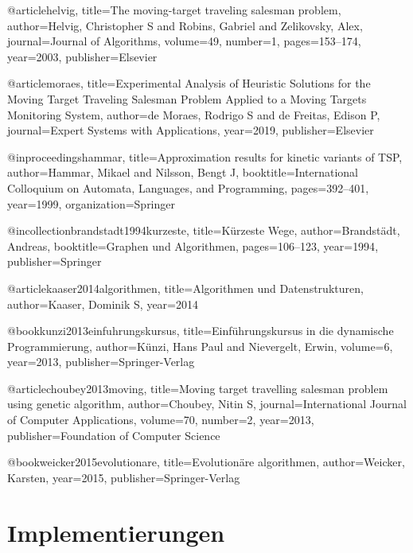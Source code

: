 \documentclass[german,version-2019-11]{uzl-thesis}
\begin{document}
\begin{bibtex-entries}
@article{helvig,
  title={The moving-target traveling salesman problem},
  author={Helvig, Christopher S and Robins, Gabriel and Zelikovsky, Alex},
  journal={Journal of Algorithms},
  volume={49},
  number={1},
  pages={153--174},
  year={2003},
  publisher={Elsevier}
}

@article{moraes,
  title={Experimental Analysis of Heuristic Solutions for the Moving Target Traveling Salesman Problem Applied to a Moving Targets Monitoring System},
  author={de Moraes, Rodrigo S and de Freitas, Edison P},
  journal={Expert Systems with Applications},
  year={2019},
  publisher={Elsevier}
}

@inproceedings{hammar,
  title={Approximation results for kinetic variants of TSP},
  author={Hammar, Mikael and Nilsson, Bengt J},
  booktitle={International Colloquium on Automata, Languages, and Programming},
  pages={392--401},
  year={1999},
  organization={Springer}
}

@incollection{brandstadt1994kurzeste,
  title={K{\"u}rzeste Wege},
  author={Brandst{\"a}dt, Andreas},
  booktitle={Graphen und Algorithmen},
  pages={106--123},
  year={1994},
  publisher={Springer}
}

@article{kaaser2014algorithmen,
  title={Algorithmen und Datenstrukturen},
  author={Kaaser, Dominik S},
  year={2014}
}

@book{kunzi2013einfuhrungskursus,
  title={Einf{\"u}hrungskursus in die dynamische Programmierung},
  author={K{\"u}nzi, Hans Paul and Nievergelt, Erwin},
  volume={6},
  year={2013},
  publisher={Springer-Verlag}
}

@article{choubey2013moving,
  title={Moving target travelling salesman problem using genetic algorithm},
  author={Choubey, Nitin S},
  journal={International Journal of Computer Applications},
  volume={70},
  number={2},
  year={2013},
  publisher={Foundation of Computer Science}
}

@book{weicker2015evolutionare,
  title={Evolution{\"a}re algorithmen},
  author={Weicker, Karsten},
  year={2015},
  publisher={Springer-Verlag}
}

\end{bibtex-entries}

%
\appendix
\chapter{Implementierungen}




%
\end{document}
